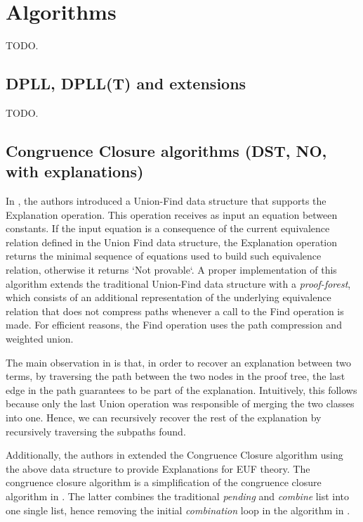 \section{Algorithms}

TODO.

\subsection{DPLL, DPLL(T) and extensions}


TODO.

\subsection{Congruence Closure algorithms (DST, NO, with explanations)}

In \cite{10.1007/978-3-540-32033-3_33}, the authors introduced a Union-Find
data structure that supports the Explanation operation. This operation receives
as input an equation between constants. If the input equation is a consequence
of the current equivalence relation defined in the Union Find data structure, the Explanation
operation returns the minimal sequence of equations used to build such equivalence relation,
otherwise it returns `Not provable`. A proper implementation of this algorithm extends the traditional
Union-Find data structure with a \emph{proof-forest}, which consists of an additional
representation of the underlying equivalence relation that does not compress
paths whenever a call to the Find operation is made. For efficient reasons, the Find operation
uses the path compression and weighted union.

The main observation in \cite{10.1007/978-3-540-32033-3_33} is that, in order to
recover an explanation between two terms, by traversing the path between the two nodes
in the proof tree, the last edge in the path guarantees to be part of the explanation.
Intuitively, this follows because only the last Union operation was responsible of merging
the two classes into one. Hence, we can recursively recover the rest of the
explanation by recursively traversing the subpaths found.

Additionally, the authors in \cite{10.1007/978-3-540-32033-3_33} extended the
Congruence Closure algorithm \cite{10.1007/978-3-540-39813-4_5} using the above
data structure to provide Explanations for EUF theory. The congruence closure algorithm
is a simplification of the congruence closure algorithm in \cite{10.1145/322217.322228}.
The latter combines the traditional \emph{pending} and \emph{combine} list into one
single list, hence removing the initial \emph{combination} loop in the algorithm in
\cite{10.1145/322217.322228}.



